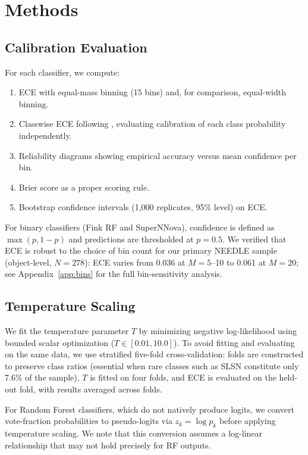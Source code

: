 \documentclass[twocolumn]{aastex631}
\begin{document}
\section{Methods} \label{sec:methods}

\subsection{Calibration Evaluation}

For each classifier, we compute:
\begin{enumerate}
    \item ECE with equal-mass binning (15 bins) and, for comparison, equal-width binning.
    \item Classwise ECE following \citet{nixon2019}, evaluating calibration of each class probability independently.
    \item Reliability diagrams showing empirical accuracy versus mean confidence per bin.
    \item Brier score as a proper scoring rule.
    \item Bootstrap confidence intervals (1,000 replicates, 95\% level) on ECE.
\end{enumerate}

For binary classifiers (Fink RF and SuperNNova), confidence is defined as $\max(p, 1-p)$ and predictions are thresholded at $p = 0.5$. We verified that ECE is robust to the choice of bin count for our primary NEEDLE sample (object-level, $N = 278$): ECE varies from 0.036 at $M = 5$--10 to 0.061 at $M = 20$; see Appendix~\ref{app:bins} for the full bin-sensitivity analysis.

\subsection{Temperature Scaling}

We fit the temperature parameter $T$ by minimizing negative log-likelihood using bounded scalar optimization ($T \in [0.01, 10.0]$). To avoid fitting and evaluating on the same data, we use stratified five-fold cross-validation: folds are constructed to preserve class ratios (essential when rare classes such as SLSN constitute only 7.6\% of the sample), $T$ is fitted on four folds, and ECE is evaluated on the held-out fold, with results averaged across folds.

For Random Forest classifiers, which do not natively produce logits, we convert vote-fraction probabilities to pseudo-logits via $z_k = \log p_k$ before applying temperature scaling. We note that this conversion assumes a log-linear relationship that may not hold precisely for RF outputs.
\end{document}
